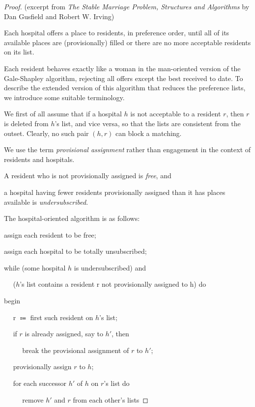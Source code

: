 \documentclass[14pt]{extarticle}
\begin{document}
\begin{proof}
(excerpt from {\it The Stable Marriage Problem, Structures and Algorithms} by Dan Gusfield and Robert W. Irving)

Each hospital offers a place to residents, in preference order, until all of its available places are (provisionally) filled or there are no more acceptable residents on its list.

Each resident behaves exactly like a woman in the man-oriented version of the Gale-Shapley algorithm, rejecting all offers except the best received to date. To describe the extended version of this algorithm that reduces the preference lists, we introduce some suitable terminology.

We first of all assume that if a hospital $h$ is not acceptable to a resident $r$, then $r$ is deleted from $h$’s list, and vice versa, so that the lists are consistent from the outset. Clearly, no such pair $(h,r)$ can block a matching. 

We use the term {\it provisional assignment} rather than engagement in the context of residents and hospitals. 

A resident who is not provisionally assigned is {\it free}, and 

a hospital having fewer residents provisionally assigned than it has places available is {\it undersubscribed}. 

The hospital-oriented algorithm is as follows:

assign each resident to be free;

assign each hospital to be totally unsubscribed;

while (some hospital $h$ is undersubscribed) and 

\,\,\,\,\,\,\,\,($h$'s list contains a resident r not provisionally assigned to h) do

begin

\,\,\,\,\,\,\,\,r $\Coloneqq$ first such resident on $h$'s list;

\,\,\,\,\,\,\,\,if $r$ is already assigned, say to $h'$, then

\,\,\,\,\,\,\,\,\,\,\,\,\,\,\,\,break the provisional assignment of $r$ to $h'$;

\,\,\,\,\,\,\,\,provisionally assign $r$ to $h$;

\,\,\,\,\,\,\,\,for each successor $h'$ of $h$ on $r$’s list do

\,\,\,\,\,\,\,\,\,\,\,\,\,\,\,\,remove $h'$ and $r$ from each other’s lists


\end{proof}
\end{document}
